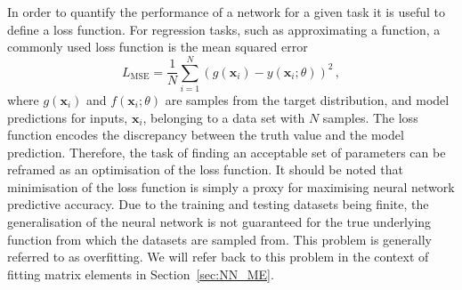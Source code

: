 \documentclass[main.tex]{subfiles}
\begin{document}
    In order to quantify the performance of a network for
    a given task it is useful to define a loss function.
    For regression tasks, such as approximating a function,
    a commonly used loss function is the mean squared error
    \begin{equation}\label{eqn:MSE}
        L_{\mathrm{MSE}} = \dfrac{1}{N} \sum_{i=1}^{N} (g(\mathbf{x}_{i}) - y(\mathbf{x}_{i}; \theta))^{2} \, ,
    \end{equation}
    where $g(\mathbf{x}_{i})$ and $f(\mathbf{x}_{i}; \theta)$
    are samples from the target distribution, and model predictions
    for inputs, $\mathbf{x}_{i}$, belonging to a data set with $N$
    samples. The loss function
    encodes the discrepancy between the truth value
    and the model prediction. Therefore, the task of finding
    an acceptable set of parameters can be reframed as an optimisation
    of the loss function. It should be noted that minimisation of
    the loss function is simply a proxy for maximising neural network
    predictive accuracy. Due to the training and testing datasets being finite,
    the generalisation of the neural network is not guaranteed for the
    true underlying function from which the datasets are sampled
    from. This problem is generally referred to as overfitting.
    We will refer back to this problem in the context of
    fitting matrix elements in Section~\ref{sec:NN_ME}.
\end{document}
